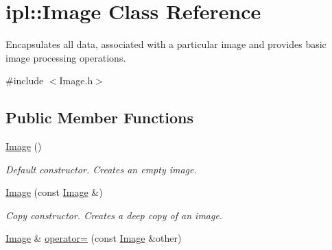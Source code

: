 \hypertarget{classipl_1_1Image}{
\section{ipl::Image Class Reference}
\label{classipl_1_1Image}
}


Encapsulates all data, associated with a particular image and provides basic image processing operations.  




{\ttfamily \#include $<$Image.h$>$}

\subsection*{Public Member Functions}
\begin{DoxyCompactItemize}
\item 
\hypertarget{classipl_1_1Image_a48b52d90c714c819ad6cddbc2768077f}{
\hyperlink{classipl_1_1Image_a48b52d90c714c819ad6cddbc2768077f}{Image} ()}
\label{classipl_1_1Image_a48b52d90c714c819ad6cddbc2768077f}

\begin{DoxyCompactList}\small\item\em Default constructor. Creates an empty image. \end{DoxyCompactList}\item 
\hypertarget{classipl_1_1Image_a43110cf78593d35fb289f5ff5ab93905}{
\hyperlink{classipl_1_1Image_a43110cf78593d35fb289f5ff5ab93905}{Image} (const \hyperlink{classipl_1_1Image}{Image} \&)}
\label{classipl_1_1Image_a43110cf78593d35fb289f5ff5ab93905}

\begin{DoxyCompactList}\small\item\em Copy constructor. Creates a deep copy of an image. \end{DoxyCompactList}\item 
\hypertarget{classipl_1_1Image_a802e130e12e6bcd8961c3aab01fd9dda}{
\hyperlink{classipl_1_1Image}{Image} \& \hyperlink{classipl_1_1Image_a802e130e12e6bcd8961c3aab01fd9dda}{operator=} (const \hyperlink{classipl_1_1Image}{Image} \&other)}
\label{classipl_1_1Image_a802e130e12e6bcd8961c3aab01fd9dda}


\end{DoxyCompactItemize}
